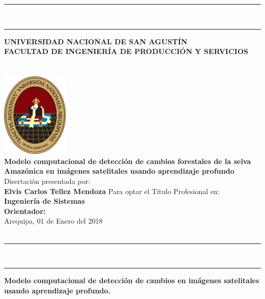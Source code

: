 \documentclass[12pt,oneside,a4paper]{book}
\begin{document}
\thispagestyle{empty}
\begin{center}
  
\rule{\textwidth}{4pt} \\ \vspace{-0.68cm}
\rule{\textwidth}{1pt}
\vspace{1cm}
\Large{\textbf{UNIVERSIDAD NACIONAL DE SAN AGUSTÍN}} \\ \vspace{-0.5cm}
\large{\textbf{FACULTAD DE INGENIERÍA DE PRODUCCIÓN Y SERVICIOS}}
~\\~\\~\\
  
    \includegraphics[width=0.24\textwidth]{logo} \\
    \vspace*{1cm}
     \textbf{\Large{Modelo computacional de detección de cambios forestales de la selva Amazónica en imágenes satelitales usando aprendizaje profundo}}\\
     \vspace*{1cm}
     \Large{Disertación presentada por:\\}
     \Large{\textbf{Elvis Carlos Tellez Mendoza}}
%    
     \vskip 1cm
     \Large{Para optar el Titulo Profesional  en:}\\
     \Large{\textbf{Ingeniería de Sistemas}}\\
    \vskip 1.5cm
 \large{\textbf{Orientador:}}\\
% 
    
    \vskip 1cm
    \normalsize{Arequipa, 01 de Enero del 2018}\\~\\
\rule{\textwidth}{1pt} \\ \vspace{-0.3cm}
\rule{\textwidth}{4pt}

\end{center}
\newpage
\thispagestyle{empty}
  \begin{center}
     \vspace*{2.3 cm}
        \textbf{\Large{Modelo computacional de detección de cambios en imágenes satelitales usando aprendizaje profundo.}}\\
        \vspace*{2 cm}
    \end{center}
\end{document}
